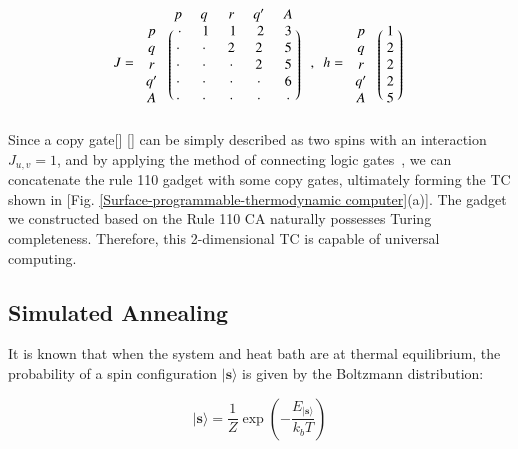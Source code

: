 \documentclass[twocolumn,superscriptaddress,english,showpacs,longbibliography]{revtex4-2}
\newcommand{\jinguo}[1]{[{\color{blue}{JGL: #1}}]}
\newcommand{\ym}[1]{[{\color{red}{YM: #1}}]}
\begin{document}
\begin{equation}
J = \begin{blockarray}{cccccc}
& p & q & r & q^\prime & A\\
\begin{block}{c(ccccc)}
p & ~\cdot~ & ~1~ & ~1~ & ~2~ & ~3~\\
q & \cdot & \cdot & 2 & 2 & 5\\
r & \cdot & \cdot & \cdot & 2 & 5\\
q^\prime & \cdot & \cdot & \cdot & \cdot & 6\\
A & \cdot & \cdot & \cdot & \cdot & \cdot\\
\end{block}
\end{blockarray}
~~, ~~h = \begin{blockarray}{cc}
& \phantom{x} \\
\begin{block}{c(c)}
p & ~1~\\
q & 2\\
r & 2\\
q^\prime & 2\\
A & 5\\
\end{block}
\end{blockarray}
\end{equation}
Since a copy gate\jinguo{do we really use copy gates?} \ym{No need in practice, but indeed used in Fig.1a} can be simply described as two spins with an interaction $J_{u, v}=1$, and by applying the method of connecting logic gates~\cite{Aadit2022}, we can concatenate the rule 110 gadget with some copy gates, ultimately forming the TC shown in [Fig. \ref{Surface-programmable-thermodynamic computer}(a)]. The gadget we constructed based on the Rule 110 CA
naturally possesses Turing completeness. Therefore, this 2-dimensional TC is capable of universal computing.

\subsection{Simulated Annealing}

It is known that when the system and heat bath are at thermal equilibrium, 
the probability of a spin configuration $|\mathbf{s}\rangle$ is given by the Boltzmann distribution:

\begin{equation}
    |\mathbf{s}\rangle = \frac{1}{Z}\exp\left(- \frac{E_{|\mathbf{s}\rangle}}{k_bT}\right)
\end{equation}
\end{document}
